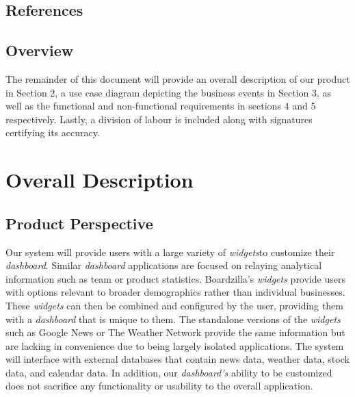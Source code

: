 \documentclass{article}
\begin{document}
\subsection{References}
\label{sub:references}


\subsection{Overview}
\label{sub:overview}
The remainder of this document will provide an overall description of our product in Section 2, a use case diagram depicting the business events in Section 3, as well as the functional and non-functional requirements in sections 4 and 5 respectively. Lastly, a division of labour is included along with signatures certifying its accuracy.

\section{Overall Description}
\label{sec:overall_description}
\subsection{Product Perspective}
\label{sub:product_perspective}
Our system will provide users with a large variety of \textit{widgets}to customize their \textit{dashboard}. Similar \textit{dashboard} applications are focused on relaying analytical information such as team or product statistics. Boardzilla's \textit{widgets} provide users with options relevant to broader demographics rather than individual businesses. These \textit{widgets} can then be combined and configured by the user, providing them with a \textit{dashboard} that is unique to them. The standalone versions of the \textit{widgets} such as Google News or The Weather Network provide the same information but are lacking in convenience due to being largely isolated applications. The system will interface with external databases that contain news data, weather data, stock data, and calendar data. In addition, our \textit{dashboard's} ability to be customized does not sacrifice any functionality or usability to the overall application.
\end{document}
